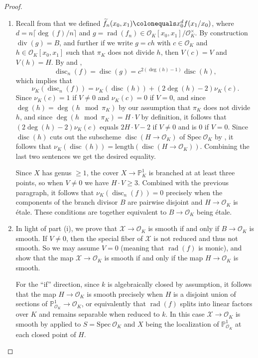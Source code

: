 \documentclass[12pt]{amsart}
\numberwithin{equation}{section}
\theoremstyle{definition}
\newcommand{\mc}[1]{\mathcal{#1}}
\newcommand{\proj}{\mathbb P}
\newcommand{\Spec}{\mathrm{Spec} \ }
\DeclareMathOperator{\divi}{div}
\DeclareMathOperator{\disc}{disc}
\DeclareMathOperator{\rad}{rad}
\begin{document}
\begin{proof}
  \hfill
 \begin{enumerate}[\upshape (i)] 
  \item Recall from  that we defined $\widetilde{f}_n(x_0, x_1) \colonequals x_0^df(x_1/x_0)$, where
$d = n\lceil \deg(f)/n \rceil$ and $g = \rad(f_n) \in \mc{O}_K[x_0,x_1]/\mc{O}_K^\times$. By construction $\divi(g)=B$, and further if we write $g = ch$ with $c
\in \mc{O}_K$ and $h \in \mc{O}_K[x_0,x_1]$ such that $\pi_K$ does not divide $h$, then $V(c) =
V$ and $V(h) = H$. By  and \cite[Chapter~12, Equation~(1.23)]{GKZ}, 
\[ \disc_n(f) = \disc(g) = c^{2(\deg(h) - 1)}\disc(h),\]
which implies that
\[ \nu_K(\disc_n(f)) = \nu_K(\disc(h)) + (2\deg(h)-2) \nu_K(c).\]
Since $\nu_K(c) = 1$ if $V \neq 0$ and $\nu_K(c) = 0$ if $V = 0$, and since $\deg(h) = \deg(h \mod \pi_K)$ by our assumption that $\pi_K$ does not divide $h$, and since $\deg(h \mod \pi_K) = H \cdot V$ by definition, it follows that $(2\deg(h)-2) \nu_K(c)$ equals $2H \cdot V-2$ if $V \neq 0$ and is $0$ if $V=0$.
Since $\disc(h)$ cuts out the subscheme $\disc(H \to \mc{O}_K)$ of $\Spec
\mc{O}_K$ by \cite[Corollary V-23]{EH}, it follows that
$\nu_K(\disc(h)) = \text{length}(\disc(H \to \mc{O}_K))$. Combining the last two sentences we get the desired equality.

Since $X$ has genus $\geq 1$, the cover $X \to \proj^1_K$ is branched at at least three points, so when $V \neq 0$ we have $H \cdot V \geq 3$. Combined with the previous paragraph, it follows that $\nu_K({\disc_n(f)}) = 0$
precisely when the components of the branch divisor $B$ are pairwise
disjoint and $H \rightarrow \mc{O}_K$ is \'{e}tale. These
conditions are together equivalent to $B \rightarrow \mc{O}_K$ being
\'{e}tale.

\item In light of part (i), we prove that $\mc{X} \to \mc{O}_K$ is
  smooth if and only if $B \to \mc{O}_K$ is smooth.  If $V \neq 0$, then the special
  fiber of $\mc{X}$ is not reduced and thus not smooth.  So we may
  assume $V = 0$ (meaning that $\rad(f)$ is monic), and show
  that the map $\mc{X} \to \mc{O}_K$ is smooth if and only if the map $H \to
  \mc{O}_K$ is smooth.

  For the ``if'' direction, since $k$ is algebraically closed by assumption, it follows that the map $H \to \mc{O}_K$ is
  smooth precisely when $H$ is a disjoint union of
  sections of $\proj^1_{\mc{O}_K} \to \mc{O}_K$, or equivalently that
  $\rad(f)$ splits into linear factors over $K$ and remains separable when
  reduced to $k$. In this case $\mc{X} \to \mc{O}_K$
  is smooth by \cite[Expos\'{e}~XIII, Proposition~5.4]{SGA1}
applied to $S = \Spec \mc{O}_K$ and $X$ being the localization of $\proj^1_{\mc{O}_K}$ at each closed
point of $H$.


\end{enumerate}
\end{proof}
\end{document}
